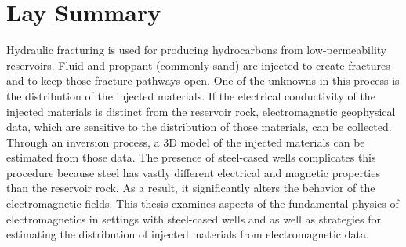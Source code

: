 
\chapter{Lay Summary}

Hydraulic fracturing is used for producing hydrocarbons from low-permeability reservoirs. Fluid and proppant (commonly sand) are injected to create fractures and to keep those fracture pathways open. One of the unknowns in this process is the distribution of the injected materials. If the electrical conductivity of the injected materials is distinct from the reservoir rock, electromagnetic geophysical data, which are sensitive to the distribution of those materials, can be collected. Through an inversion process, a 3D model of the injected materials can be estimated from those data. The presence of steel-cased wells complicates this procedure because steel has vastly different electrical and magnetic properties than the reservoir rock. As a result, it significantly alters the behavior of the electromagnetic fields. This thesis examines aspects of the fundamental physics of electromagnetics in settings with steel-cased wells and as well as strategies for estimating the distribution of injected materials from electromagnetic data.


